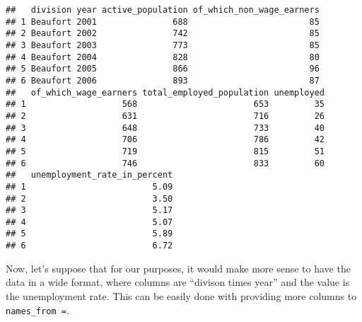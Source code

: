 \documentclass[
]{article}
\newenvironment{Shaded}{\begin{snugshade}}{\end{snugshade}}
\newcommand{\DataTypeTok}[1]{\textcolor[rgb]{0.13,0.29,0.53}{#1}}
\newcommand{\DecValTok}[1]{\textcolor[rgb]{0.00,0.00,0.81}{#1}}
\newcommand{\KeywordTok}[1]{\textcolor[rgb]{0.13,0.29,0.53}{\textbf{#1}}}
\newcommand{\NormalTok}[1]{#1}
\newcommand{\OperatorTok}[1]{\textcolor[rgb]{0.81,0.36,0.00}{\textbf{#1}}}
\newcommand{\StringTok}[1]{\textcolor[rgb]{0.31,0.60,0.02}{#1}}
\begin{document}
\begin{verbatim}
##   division year active_population of_which_non_wage_earners
## 1 Beaufort 2001               688                        85
## 2 Beaufort 2002               742                        85
## 3 Beaufort 2003               773                        85
## 4 Beaufort 2004               828                        80
## 5 Beaufort 2005               866                        96
## 6 Beaufort 2006               893                        87
##   of_which_wage_earners total_employed_population unemployed
## 1                   568                       653         35
## 2                   631                       716         26
## 3                   648                       733         40
## 4                   706                       786         42
## 5                   719                       815         51
## 6                   746                       833         60
##   unemployment_rate_in_percent
## 1                         5.09
## 2                         3.50
## 3                         5.17
## 4                         5.07
## 5                         5.89
## 6                         6.72
\end{verbatim}

Now, let's suppose that for our purposes, it would make more sense to have the data in a wide format,
where columns are ``divison times year'' and the value is the unemployment rate. This can be easily done
with providing more columns to \texttt{names\_from\ =}.

\begin{Shaded}
\end{Shaded}
\end{document}
